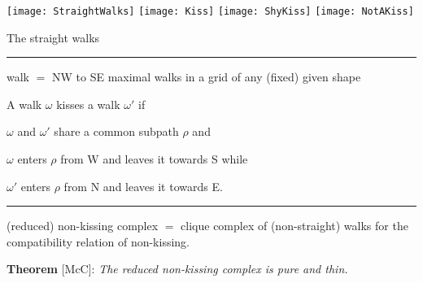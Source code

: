\documentclass[portrait,final,a0paper,fontscale=0.25]{baposter}
\theoremstyle{definition}
\begin{document}
\begin{poster}
{\hspace*{.1cm}\texttt{[image: StraightWalks]}
\hspace*{.3cm}\texttt{[image: Kiss]}
\hspace*{.3cm}\texttt{[image: ShyKiss]}
\hspace*{.3cm}\texttt{[image: NotAKiss]}

{\footnotesize The straight walks}
\hspace*{.8cm}{\footnotesize A kiss}
\hspace*{1.3cm}{\footnotesize A shy kiss}
\hspace*{1.1cm}{\footnotesize No kissing}



\vspace{-.2cm}
\hspace{-.25cm}
{\color{green} \rule{10.02cm}{1pt}}
\vspace{-.35cm}

{\color{green} walk} $=$ NW to SE maximal walks in a grid of any (fixed) given shape %

\medskip

A walk $\omega$ {\color{green} kisses} a walk $\omega'$ if 
\begin{compactitem}
\item $\omega$ and $\omega'$ share a common subpath $\rho$ and
\item $\omega$ enters $\rho$ from W and leaves it towards S while
\item $\omega'$ enters $\rho$ from N and leaves it towards E.
\end{compactitem}

\hspace{-.25cm}
{\color{green} \rule{10.02cm}{1pt}}
\vspace{-.35cm}

{\color{green} (reduced) non-kissing complex} $=$ clique complex of (non-straight) walks for the compatibility relation of non-kissing.

\medskip
{\color{green} \bf Theorem} [McC]: {\it The reduced non-kissing complex is pure and thin.}

}
\end{poster}
\end{document}
